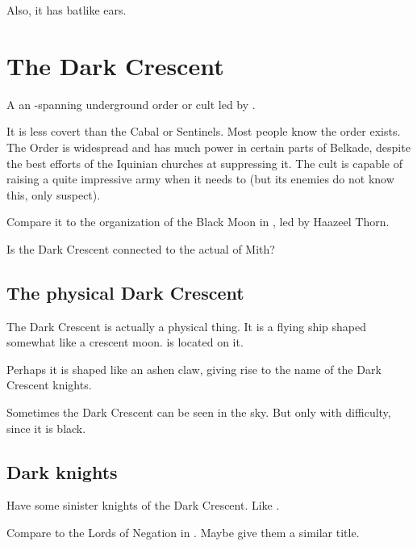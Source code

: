 Also, it has batlike ears. 















\section{The Dark Crescent}
\label{Dark Crescent}
A an \Azmith-spanning underground order or cult led by \Psiotai. 

It is less covert than the Cabal or Sentinels. Most people know the order exists. The Order is widespread and has much power in certain parts of Belkade, despite the best efforts of the Iquinian churches at suppressing it. The cult is capable of raising a quite impressive army when it needs to (but its enemies do not know this, only suspect). 

Compare it to the organization of the Black Moon in \FLuneNoire, led by Haazeel Thorn. 

Is the Dark Crescent connected to the actual  of Mith? 







\subsection{The physical Dark Crescent}
The Dark Crescent is actually a physical thing. It is a flying ship shaped somewhat like a crescent moon.  is located on it. 

Perhaps it is shaped like an ashen claw, giving rise to the name of the Dark Crescent knights. 

Sometimes the Dark Crescent can be seen in the sky. But only with difficulty, since it is black. 







\subsection{Dark knights}
\label{Dark Crescent Knights}
Have some sinister knights of the Dark Crescent. Like . 

Compare to the Lords of Negation in \FLuneNoire. Maybe give them a similar title. 

